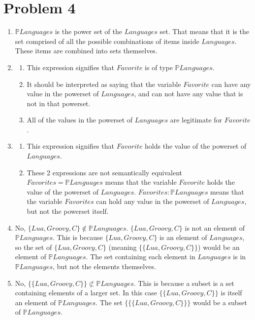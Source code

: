 \documentclass[12pt]{article}
\begin{document}
\section*{Problem 4}
\begin{enumerate}
\item $\mathbb{P}Languages$ is the power set of the $Languages$ set. That means that it is the set comprised of all the possible combinations of items inside $Languages$. These items are combined into sets themselves. 
\item 
\begin{enumerate}
\item This expression signifies that $Favorite$ is of type $\mathbb{P}Languages$. 
\item It should be interpreted as saying that the variable $Favorite$ can have any value in the powerset of $Languages$, and can not have any value that is not in that powerset. 
\item All of the values in the powerset of $Languages$ are legitimate for $Favorite$. 
\end{enumerate}
\item 
\begin{enumerate}
\item This expression signifies that $Favorite$ holds the value of the powerset of $Languages$. 
\item These 2 expressions are not semantically equivalent $Favorites = \mathbb{P}Languages$ means that the variable  $Favorite$ holds the value of the powerset of $Languages$. $Favorites:\mathbb{P}Languages$ means that the variable $Favorites$ can hold any value in the powerset of $Languages$, but not the powerset itself.
\end{enumerate}
\item No, $\{Lua, Groovy, C\} \notin \mathbb{P}Languages$. $\{Lua, Groovy, C\}$ is not an element of $\mathbb{P}Languages$. This is because $\{Lua, Groovy, C\}$ is an element of $Languages$, so the set of $\{Lua, Groovy, C\} $ (meaning $\{\{Lua, Groovy, C\}\} $)  would be an element of $\mathbb{P}Languages$. The set containing each element in $Languages$ is in $\mathbb{P}Languages$, but not the elements themselves.

\item No, $\{\{Lua, Groovy, C\}\} \not\subset \mathbb{P}Languages$. This is because a subset is a set containing elements of a larger set. In this case $\{\{Lua, Groovy, C\}\}$ is itself an element of $\mathbb{P}Languages$. The set  $\{\{\{Lua, Groovy, C\}\}\}$ would be a subset of $\mathbb{P}Languages$.


\end{enumerate}
\end{document}
